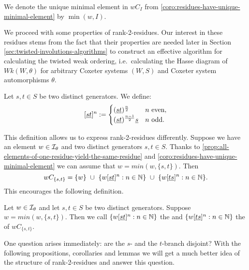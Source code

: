 \begin{defi}
	We denote the unique minimal element in $wC_I$ from \ref{coro:residues-have-unique-minimal-element} by $\min(w,I)$.
\end{defi}

We proceed with some properties of rank-2-residues. Our interest in these residues stems from the fact that their properties are needed later in Section \ref{sec:twisted-involutions-algorithms} to construct an effective algorithm for calculating the twisted weak ordering, i.e.\ calculating the Hasse diagram of $Wk(W,\theta)$ for arbitrary Coxeter systems $(W,S)$ and Coxeter system automorphisms $\theta$.

\begin{defi}
	Let $s,t \in S$ be two distinct generators. We define:
	$$[\underline{s} \underline{t}]^n :=
	\begin{cases}
	(\underline{s} \underline{t})^{\frac{n}{2}} & n \textrm{ even}, \\
	(\underline{s} \underline{t})^{\frac{n-1}{2}} \underline{s} & n \textrm{ odd}. 
	\end{cases}$$
\end{defi}

This definition allows us to express rank-2-residues differently. Suppose we have an element $w \in \mathcal{I}_{\theta}$ and two distinct generators $s,t \in S$. Thanks to \ref{prop:all-elements-of-one-residue-yield-the-same-residue} and \ref{coro:residues-have-unique-minimal-element} we can assume that $w = min(w,\{s,t\})$. Then
$$ wC_{\{s,t\}} = \{ w \} \ \cup \ \{ w [\underline{s} \underline{t}]^n : n \in \mathbb{N} \} \ \cup \ \{ w [\underline{t} \underline{s}]^n : n \in \mathbb{N} \}. $$
This encourages the following definition.

\begin{defi}
	Let $w \in \mathcal{I}_{\theta}$ and let $s,t \in S$ be two distinct generators. Suppose $w = min(w,\{s,t\})$. Then we call $\{ w [\underline{s} \underline{t}]^n : n \in \mathbb{N} \}$ the  and $\{ w [\underline{t} \underline{s}]^n : n \in \mathbb{N} \}$ the  of $wC_{\{s,t\}}$.
\end{defi}

One question arises immediately: are the $s$- and the $t$-branch disjoint? With the following propositions, corollaries and lemmas we will get a much better idea of the structure of rank-2-residues and answer this question.

